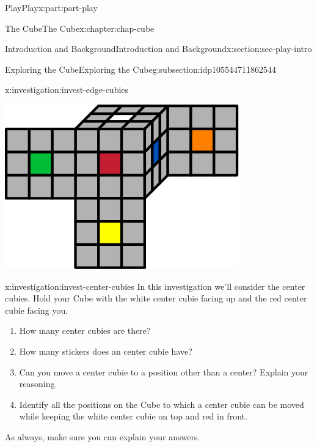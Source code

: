 \documentclass[oneside,10pt,]{book}
\numberwithin{equation}{section}
\begin{document}
\begin{partptx}{Play}{}{Play}{}{}{x:part:part-play}
\begin{chapterptx}{The Cube}{}{The Cube}{}{}{x:chapter:chap-cube}
\begin{sectionptx}{Introduction and Background}{}{Introduction and Background}{}{}{x:section:sec-play-intro}
\begin{subsectionptx}{Exploring the Cube}{}{Exploring the Cube}{}{}{g:subsection:idp105544711862544}
\begin{investigation}{}{x:investigation:invest-edge-cubies}
\begin{image}{0.25}{0.5}{0.25}
\includegraphics[width=\linewidth]{./images/moving_cubies.svg}
\end{image}%
\end{investigation}%
\begin{investigation}{}{x:investigation:invest-center-cubies}%
In this investigation we'll consider the center cubies. Hold your Cube with the white center cubie facing up and the red center cubie facing you.%
\begin{enumerate}
\item{}How many center cubies are there?%
\item{}How many stickers does an center cubie have?%
\item{}Can you move a center cubie to a position other than a center? Explain your reasoning.%
\item{}Identify all the positions on the Cube to which a center cubie can be moved while keeping the white center cubie on top and red in front.%
\end{enumerate}
As always, make sure you can explain your answers.%
\begin{image}{0.25}{0.5}{0.25}%

\end{image}
\end{investigation}
\end{subsectionptx}
\end{sectionptx}
\end{chapterptx}
\end{partptx}
\end{document}
